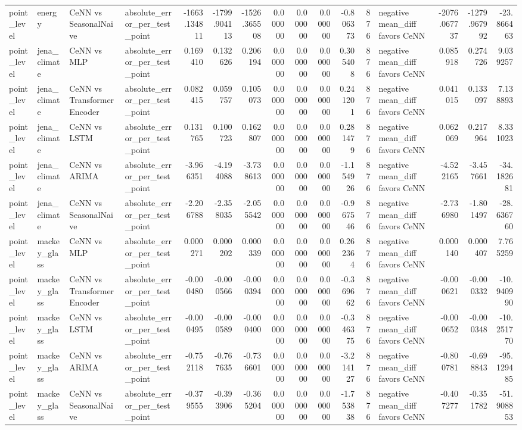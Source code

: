 \begin{tabular}{llllrrrrrrrrlrrr}
point_level & energy & CeNN vs SeasonalNaive & absolute_error_per_test_point & -1663.134811 & -1799.904113 & -1526.365508 & 0.000000 & 0.000000 & 0.000000 & -0.806373 & 876 & negative mean_diff favors CeNN & -2076.067737 & -1279.967992 & -23.866463 \\
point_level & jena_climate & CeNN vs MLP & absolute_error_per_test_point & 0.169410 & 0.132626 & 0.206194 & 0.000000 & 0.000000 & 0.000000 & 0.305408 & 876 & negative mean_diff favors CeNN & 0.085918 & 0.274726 & 9.039257 \\
point_level & jena_climate & CeNN vs TransformerEncoder & absolute_error_per_test_point & 0.082415 & 0.059757 & 0.105073 & 0.000000 & 0.000000 & 0.000000 & 0.241201 & 876 & negative mean_diff favors CeNN & 0.041015 & 0.133097 & 7.138893 \\
point_level & jena_climate & CeNN vs LSTM & absolute_error_per_test_point & 0.131765 & 0.100723 & 0.162807 & 0.000000 & 0.000000 & 0.000000 & 0.281479 & 876 & negative mean_diff favors CeNN & 0.062069 & 0.217964 & 8.331023 \\
point_level & jena_climate & CeNN vs ARIMA & absolute_error_per_test_point & -3.966351 & -4.194088 & -3.738613 & 0.000000 & 0.000000 & 0.000000 & -1.154926 & 876 & negative mean_diff favors CeNN & -4.522165 & -3.457661 & -34.182681 \\
point_level & jena_climate & CeNN vs SeasonalNaive & absolute_error_per_test_point & -2.206788 & -2.358035 & -2.055542 & 0.000000 & 0.000000 & 0.000000 & -0.967546 & 876 & negative mean_diff favors CeNN & -2.736980 & -1.801497 & -28.636760 \\
point_level & mackey_glass & CeNN vs MLP & absolute_error_per_test_point & 0.000271 & 0.000202 & 0.000339 & 0.000000 & 0.000000 & 0.000000 & 0.262364 & 876 & negative mean_diff favors CeNN & 0.000140 & 0.000407 & 7.765259 \\
point_level & mackey_glass & CeNN vs TransformerEncoder & absolute_error_per_test_point & -0.000480 & -0.000566 & -0.000394 & 0.000000 & 0.000000 & 0.000000 & -0.369662 & 876 & negative mean_diff favors CeNN & -0.000621 & -0.000332 & -10.940990 \\
point_level & mackey_glass & CeNN vs LSTM & absolute_error_per_test_point & -0.000495 & -0.000589 & -0.000400 & 0.000000 & 0.000000 & 0.000000 & -0.346375 & 876 & negative mean_diff favors CeNN & -0.000652 & -0.000348 & -10.251770 \\
point_level & mackey_glass & CeNN vs ARIMA & absolute_error_per_test_point & -0.752118 & -0.767635 & -0.736601 & 0.000000 & 0.000000 & 0.000000 & -3.214127 & 876 & negative mean_diff favors CeNN & -0.800781 & -0.698843 & -95.129485 \\
point_level & mackey_glass & CeNN vs SeasonalNaive & absolute_error_per_test_point & -0.379555 & -0.393906 & -0.365204 & 0.000000 & 0.000000 & 0.000000 & -1.753838 & 876 & negative mean_diff favors CeNN & -0.407277 & -0.351782 & -51.908853 \\
\bottomrule
\end{tabular}
